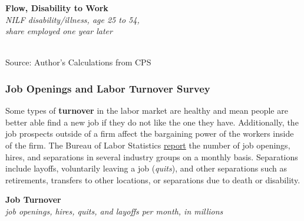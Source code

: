 \documentclass{report}
\makeatletter
\newcommand{\tbllink}[1]{\href{https://raw.githubusercontent.com/bdecon/US-chartbook/master/chartbook/data/#1}{\faTable}}
\newcommand*\short[1]{\expandafter\@gobbletwo\number\numexpr#1\relax}
\newcommand{\shdateaxisticks}{
		date coordinates in=x, axis line style={draw=none},
		xmax={2023-10-01},
		max space between ticks=40,	    
		xtick={{1990-01-01}, {1995-01-01}, {2000-01-01}, 
			{2005-01-01}, {2010-01-01}, {2015-01-01}, {2020-01-01}},
		minor xtick={},
		enlarge y limits={0.06}, enlarge x limits={0.01},
		}
\newcommand{\bbar}[2]{extra #1 ticks = {{#2}}, extra #1 tick labels = ,
		extra #1 tick style = {grid=major, grid style={thick, black!25}},}
\newcommand{\thickline}[4]{\addplot[ultra thick, no markers, color=#1] 
		table [x=#2, y=#3, col sep=comma] {#4};	}
\newcommand{\rebars}{
		\fill[color=black!10] (axis cs:{2007-12-01},\pgfkeysvalueof{/pgfplots/ymin}) rectangle 
			(axis cs:{2009-07-01}, \pgfkeysvalueof{/pgfplots/ymax});
		\fill[color=black!10] (axis cs:{2001-03-01},\pgfkeysvalueof{/pgfplots/ymin}) rectangle 
			(axis cs:{2001-11-01}, \pgfkeysvalueof{/pgfplots/ymax});
		\fill[color=black!10] (axis cs:{2020-02-01},\pgfkeysvalueof{/pgfplots/ymin}) rectangle 
			(axis cs:{2020-05-01}, \pgfkeysvalueof{/pgfplots/ymax});}
\makeatother
\begin{document}
{\begin{minipage}{0.28\textwidth}
\small 
\end{minipage} \hspace{5mm} \begin{minipage}{0.44\textwidth}
\normalsize \textbf{Flow, Disability to Work}\\
\footnotesize{\textit{NILF disability/illness, age 25 to 54, }}\\
\footnotesize{\textit{share employed one year later}}\\
\hspace*{-2mm} \\
\footnotesize{Source: Author's Calculations from CPS} \hfill \tbllink{disflow.csv}
\end{minipage}
\newpage
\begin{minipage}{0.76\textwidth}     
\subsubsection*{Job Openings and Labor Turnover Survey}
\small Some types of \textbf{turnover} in the labor market are healthy and mean people are better able find a new job if they do not like the one they have. Additionally, the job prospects outside of a firm affect the bargaining power of the workers inside of the firm. The Bureau of Labor Statistics \href{https://www.bls.gov/news.release/pdf/jolts.pdf}{report} the number of job openings, hires, and separations in several industry groups on a monthly basis. Separations include layoffs, voluntarily leaving a job (\textit{quits}), and other separations such as retirements, transfers to other locations, or separations due to death or disability. 

\small 
\vspace{1mm}

\normalsize \textbf{Job Turnover}\\
\footnotesize{\textit{job openings, hires, quits, and layoffs per month, in millions}}
\vspace{4.0cm}


\end{minipage}}
\end{document}
